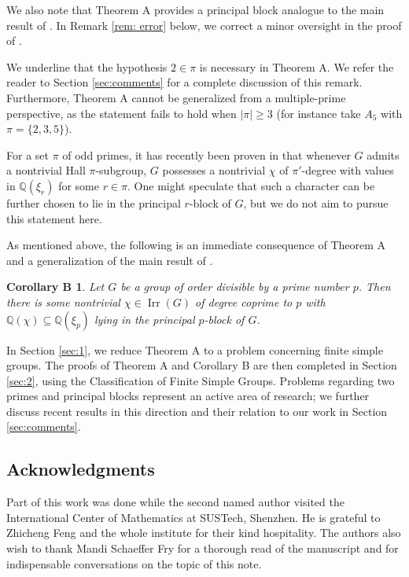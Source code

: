 \documentclass[a4paper,12pt,leqno]{amsart}
\def\irr#1{{\Irr}(#1)}
\def\sbs{\subseteq}
\newcommand{\6}{^}
\newcommand{\Irr}{\operatorname{Irr}}
\newtheorem*{corB}{Corollary B}
\theoremstyle{definition}
\theoremstyle{definition}
\theoremstyle{definition}
\theoremstyle{definition}
\theoremstyle{definition}
\def\Q{\mathbb Q}
\begin{document}
We also note that Theorem A provides a principal block analogue to the main result of \cite{GHSV21}. In Remark \ref{rem: error} below, we correct a minor oversight in the proof of \cite[Theorem D]{GHSV21}.

We underline that the hypothesis $2 \in \pi$ is necessary in Theorem A. We refer the reader to Section \ref{sec:comments} for a complete discussion of this remark. 
Furthermore, Theorem A cannot be generalized from a multiple-prime perspective, as the statement fails to hold when $|\pi| \ge 3$ (for instance take $A_5$ with $\pi=\{2,3,5\}$).

For a set $\pi$ of odd primes, it has recently been proven in \cite{GH26} that whenever $G$ admits a nontrivial Hall $\pi$-subgroup, $G$ possesses a nontrivial $\chi$ of $\pi'$-degree with values in $\mathbb Q(\xi_r)$ for some $r \in \pi$. One might speculate that such a character can be further chosen to lie in the principal $r$-block of $G$, but we do not aim to pursue this statement here.




As mentioned above, the following is an immediate consequence of Theorem A and a generalization of the main result of \cite{NT06}.
  
\begin{corB} Let $G$ be a group of order divisible by a prime number $p$. Then there is some nontrivial $\chi \in \irr G$ of degree coprime to $p$ with $\Q(\chi)\sbs \Q(\xi_p)$ lying in the principal $p$-block of $G$.
 \end{corB}
 


In Section \ref{sec:1}, we reduce Theorem A to a problem concerning finite simple groups. The proofs of Theorem A and Corollary B are then completed in Section \ref{sec:2}, using the Classification of Finite Simple Groups.
Problems regarding two primes and principal blocks represent an active area of research; we further discuss recent results in this direction and their relation to our work in Section \ref{sec:comments}.

 \subsection*{Acknowledgments} Part of this work was done while the second named author visited the International Center of Mathematics at SUSTech, Shenzhen. He is grateful to Zhicheng Feng and the whole institute for their kind hospitality. The authors also wish to thank Mandi Schaeffer Fry for a thorough read of the manuscript and for indispensable conversations on the topic of this note.
 
\end{document}
